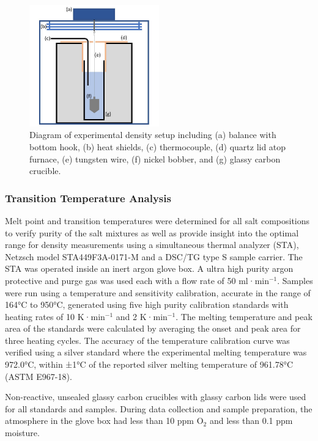 \documentclass[review]{elsarticle}
\begin{document}
\begin{figure}[h]
 \centering
 \includegraphics[width=0.5\textwidth]{images/Density_exp_setup.jpg} 
 \caption{Diagram of experimental density setup including (a) balance with bottom hook, (b) heat shields, (c) thermocouple, (d) quartz lid atop furnace, (e) tungsten wire, (f) nickel bobber, and (g) glassy carbon crucible.}
 \label{fig:dens}
\end{figure} 

\subsubsection{Transition Temperature Analysis}

Melt point and transition temperatures were determined for all salt compositions to verify purity of the salt mixtures as well as provide insight into the optimal range for density measurements using a simultaneous thermal analyzer (STA), Netzsch model STA449F3A-0171-M and a DSC/TG type S sample carrier. The STA was operated inside an inert argon glove box. A ultra high purity argon protective and purge gas was used each with a flow rate of 50 ml·min$^{-1}$. Samples were run using a temperature and sensitivity calibration, accurate in the range of 164°C to 950°C, generated using five high purity calibration standards with heating rates of 10 K·min$^{-1}$ and 2 K·min$^{-1}$. The melting temperature and peak area of the standards were calculated by averaging the onset and peak area for three heating cycles. The accuracy of the temperature calibration curve was verified using a silver standard where the experimental melting temperature was 972.0°C, within ±1°C of the reported silver melting temperature of 961.78°C (ASTM E967-18). 

Non-reactive, unsealed glassy carbon crucibles with glassy carbon lids were used for all standards and samples. During data collection and sample preparation, the atmosphere in the glove box had less than 10 ppm O$_2$ and less than 0.1 ppm moisture. 
\end{document}
